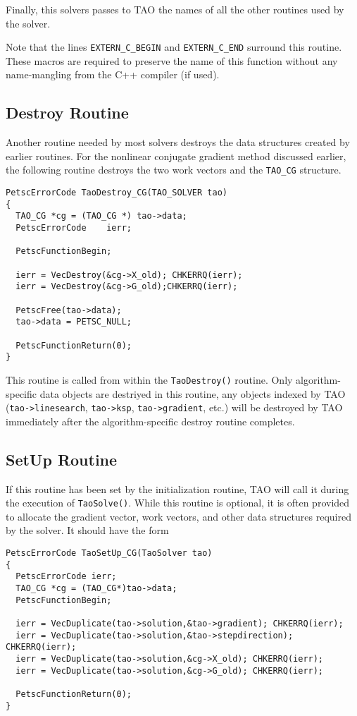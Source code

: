 Finally, this solvers passes to TAO the names of all the other routines
used by the solver.  

Note that the lines {\tt EXTERN\_C\_BEGIN} and {\tt EXTERN\_C\_END} surround
this routine.  These macros are required to preserve the name of this
function without any name-mangling from the C++ compiler (if used).

\subsection{Destroy Routine}
Another routine needed by most solvers destroys the data structures
created by earlier routines.  For the nonlinear conjugate gradient
method discussed earlier, the following routine destroys the two
work vectors and the {\tt TAO\_CG} structure.
\begin{verbatim}
PetscErrorCode TaoDestroy_CG(TAO_SOLVER tao)
{
  TAO_CG *cg = (TAO_CG *) tao->data;
  PetscErrorCode    ierr;

  PetscFunctionBegin;

  ierr = VecDestroy(&cg->X_old); CHKERRQ(ierr);
  ierr = VecDestroy(&cg->G_old);CHKERRQ(ierr);

  PetscFree(tao->data);
  tao->data = PETSC_NULL;

  PetscFunctionReturn(0);
}
\end{verbatim}
This routine is called from within the {\tt TaoDestroy()} routine.
Only algorithm-specific data objects are destriyed in this
routine, any objects indexed by TAO ({\tt tao->linesearch}, {\tt tao->ksp}, {\tt tao->gradient}, etc.)
will be destroyed by TAO immediately after the algorithm-specific destroy 
routine completes.


\subsection{SetUp Routine}
If this routine has been set by the initialization routine, TAO
will call it during the execution of \texttt{TaoSolve()}.
While this routine is optional, it is often provided to allocate
the gradient vector, work vectors, and other data structures 
required by the solver.
It should have the form
\begin{verbatim}
PetscErrorCode TaoSetUp_CG(TaoSolver tao)
{
  PetscErrorCode ierr;
  TAO_CG *cg = (TAO_CG*)tao->data;
  PetscFunctionBegin;

  ierr = VecDuplicate(tao->solution,&tao->gradient); CHKERRQ(ierr);
  ierr = VecDuplicate(tao->solution,&tao->stepdirection); CHKERRQ(ierr);
  ierr = VecDuplicate(tao->solution,&cg->X_old); CHKERRQ(ierr);
  ierr = VecDuplicate(tao->solution,&cg->G_old); CHKERRQ(ierr);

  PetscFunctionReturn(0);
}
\end{verbatim}

